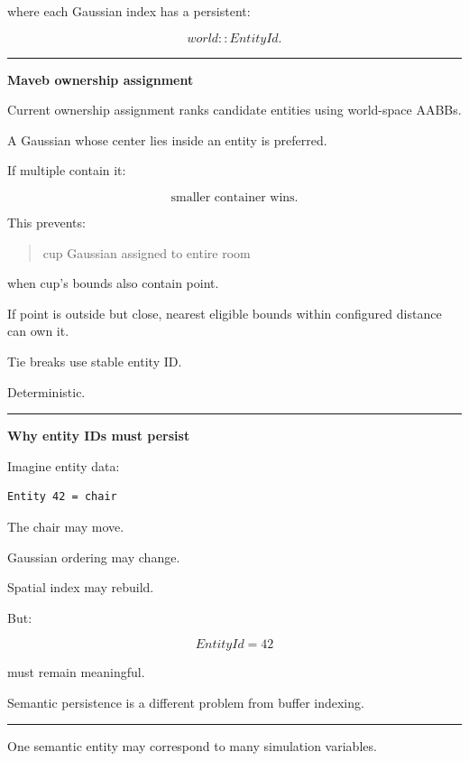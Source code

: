 where each Gaussian index has a persistent:

\[
world::EntityId.
\]

\begin{center}\rule{0.5\linewidth}{0.5pt}\end{center}

\textbf{Maveb ownership assignment}

Current ownership assignment ranks candidate entities using world-space AABBs.

A Gaussian whose center lies inside an entity is preferred.

If multiple contain it:

\[
\boxed{
\text{smaller container wins}.
}
\]

This prevents:

\begin{quote}
cup Gaussian assigned to entire room
\end{quote}

when cup's bounds also contain point.

If point is outside but close, nearest eligible bounds within configured distance can own it.

Tie breaks use stable entity ID.

Deterministic.

\begin{center}\rule{0.5\linewidth}{0.5pt}\end{center}

\textbf{Why entity IDs must persist}

Imagine entity data:

\protect{}\label{7x0yqd}%
\begin{verbatim}
Entity 42 = chair
\end{verbatim}

The chair may move.

Gaussian ordering may change.

Spatial index may rebuild.

But:

\[
EntityId=42
\]

must remain meaningful.

Semantic persistence is a different problem from buffer indexing.

\begin{center}\rule{0.5\linewidth}{0.5pt}\end{center}

One semantic entity may correspond to many simulation variables.

